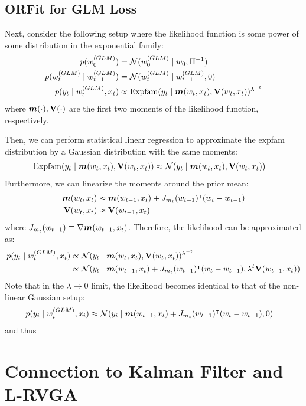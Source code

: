 \subsection{ORFit for GLM Loss}
\label{sec:orfit_nonlinear}
Next, consider the following setup where the likelihood function is some power of some
distribution in the exponential family:
\begin{align}
    p(w_0^{(GLM)}) &= \mathcal{N}(w_0^{(GLM)} \mid w_0, \Pi^{-1}) \\
    p(w_t^{(GLM)} \mid w_{t-1}^{(GLM)}) &= \mathcal{N}(w_t^{(GLM)} \mid w_{t-1}^{(GLM)}, 0) \\
    p(y_t \mid w_t^{(GLM)}, x_t) &\propto \mathrm{Expfam}(y_t \mid {\bm{m}}(w_t, x_t), \mathbf{V}(w_t, x_t))^{\lambda^{-t}}
\end{align}
where ${\bm{m}}(\cdot), \mathbf{V}(\cdot)$ are the first two moments of the likelihood function,
respectively.

Then, we can perform statistical linear regression to approximate the expfam distribution by a
Gaussian distribution with the same moments:
\begin{align}
    \mathrm{Expfam}(y_t \mid {\bm{m}}(w_t, x_t), \mathbf{V}(w_t, x_t)) &\approx \mathcal{N}(y_t \mid {\bm{m}}(w_t, x_t), \mathbf{V}(w_t, x_t))
\end{align}
Furthermore, we can linearize the moments around the prior mean:
\begin{align}
    {\bm{m}}(w_t, x_t) &\approx {\bm{m}}(w_{t-1}, x_t) + J_{m_t}(w_{t-1})^{\intercal} (w_t - w_{t-1}) \\
    \mathbf{V}(w_t, x_t) &\approx \mathbf{V}(w_{t-1}, x_t)
\end{align}
where $J_{m_t}(w_{t-1}) \equiv \nabla {\bm{m}}(w_{t-1}, x_t)$.
Therefore, the likelihood can be approximated as:
\begin{align}
    p(y_t \mid w_t^{(GLM)}, x_t) &\propto \mathcal{N}(y_t \mid {\bm{m}}(w_t, x_t), \mathbf{V}(w_t, x_t))^{\lambda^{-t}} \\
    &\propto \mathcal{N}(y_t \mid {\bm{m}}(w_{t-1}, x_t) + J_{m_t}(w_{t-1})^{\intercal}(w_t - w_{t-1}), \lambda^{t} \mathbf{V}(w_{t-1}, x_t))
\end{align}
Note that in the $\lambda \to 0$ limit, the likelihood becomes identical to that of the non-linear Gaussian setup:
\begin{align}
    p(y_i \mid w_i^{(GLM)}, x_i) &\approx \mathcal{N}(y_i \mid {\bm{m}}(w_{t-1}, x_t) + J_{m_t}(w_{t-1})^{\intercal}(w_t - w_{t-1}), 0)
\end{align}
and thus 


\section{Connection to Kalman Filter and L-RVGA}
